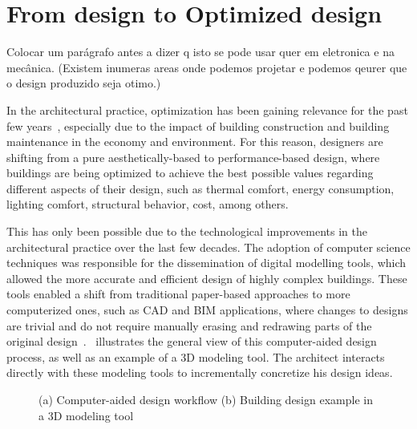 \section{From design to Optimized design}

	
	Colocar um parágrafo antes a dizer q isto se pode usar quer em eletronica e na mecânica. (Existem inumeras areas onde podemos projetar e podemos qeurer que o design produzido seja otimo.) 

	In the architectural practice, optimization has been gaining relevance for the past few years~\cite{Cichocka2017SURVEY}, especially due to the impact of building construction and building maintenance in the economy and environment. For this reason, designers are shifting from a pure aesthetically-based to performance-based design, where buildings are being optimized to achieve the best possible values regarding different aspects of their design, such as thermal comfort, energy consumption, lighting comfort, structural behavior, cost, among others.

	This has only been possible due to the technological improvements in the architectural practice over the last few decades. The adoption of computer science techniques was responsible for the dissemination of digital modelling tools, which allowed the more accurate and efficient design of highly complex buildings. These tools enabled a shift from traditional paper-based approaches to more computerized ones, such as \ac{CAD} and \ac{BIM} applications, where changes to designs are trivial and do not require manually erasing and redrawing parts of the original design~\cite{Ferreira2015GD}.~ illustrates the general view of this computer-aided design process, as well as an example of a 3D modeling tool. The architect interacts directly with these modeling tools to incrementally concretize his design ideas.
	
\begin{figure}[htbp]
\centering
{}%
\hfill
{}%

\caption[General views of Traditional Design Approaches]{(a) Computer-aided design workflow (b) Building design example in a 3D modeling tool}
\label{fig:traditionaldesign}
\end{figure}

